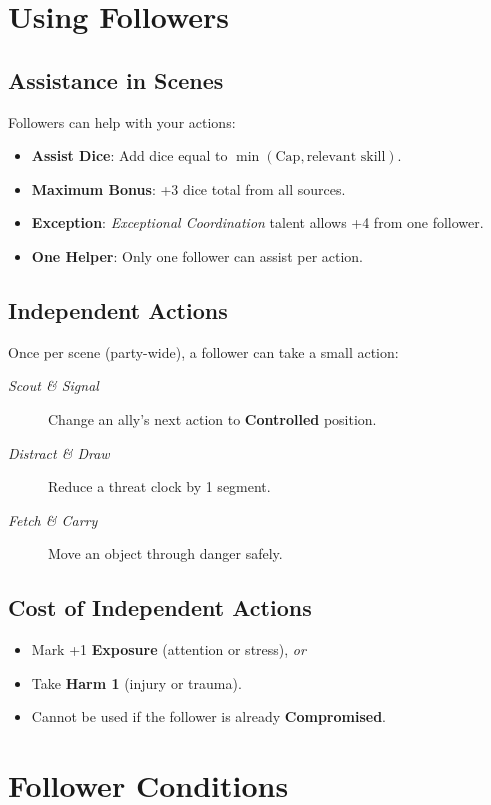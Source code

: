 \section{Using Followers}

\subsection*{Assistance in Scenes}
Followers can help with your actions:
\begin{itemize}
\item \textbf{Assist Dice}: Add dice equal to $\min(\text{Cap}, \text{relevant skill})$.
\item \textbf{Maximum Bonus}: +3 dice total from all sources.
\item \textbf{Exception}: \emph{Exceptional Coordination} talent allows +4 from one follower.
\item \textbf{One Helper}: Only one follower can assist per action.
\end{itemize}

\subsection*{Independent Actions}
Once per scene (party-wide), a follower can take a small action:
\begin{description}
\item[\emph{Scout \& Signal}] Change an ally's next action to \textbf{Controlled} position.
\item[\emph{Distract \& Draw}] Reduce a threat clock by 1 segment.
\item[\emph{Fetch \& Carry}] Move an object through danger safely.
\end{description}

\subsection*{Cost of Independent Actions}
\begin{itemize}
\item Mark +1 \textbf{Exposure} (attention or stress), \emph{or}
\item Take \textbf{Harm 1} (injury or trauma).
\item Cannot be used if the follower is already \textbf{Compromised}.
\end{itemize}

\section{Follower Conditions}

